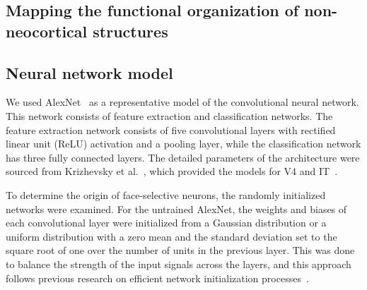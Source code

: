 \documentclass[sn-mathphys-num]{sn-jnl}%
\theoremstyle{thmstyleone}%
\theoremstyle{thmstyletwo}%
\theoremstyle{thmstylethree}%
\begin{document}
\subsection{Mapping the functional organization of non-neocortical structures} \label{sec:functional_mapping}


\subsection{Neural network model} \label{sec:nn}
We used AlexNet~\cite{krizhevsky2012imagenet} as a representative model of the convolutional neural network.
This network consists of feature extraction and classification networks.
The feature extraction network consists of five convolutional layers with rectified linear unit (ReLU) activation and a pooling layer, while the classification network has three fully connected layers.
The detailed parameters of the architecture were sourced from Krizhevsky et al.~\cite{krizhevsky2012imagenet}, which provided the models for V4 and IT~\cite{cadieu2014deep}.


To determine the origin of face-selective neurons, the randomly initialized networks were examined.
For the untrained AlexNet, the weights and biases of each convolutional layer were initialized from a Gaussian distribution or a uniform distribution with a zero mean and the standard deviation set to the square root of one over the number of units in the previous layer.
This was done to balance the strength of the input signals across the layers, 
and this approach follows previous research on efficient network initialization processes~\cite{lecun2002efficient}.
\end{document}
